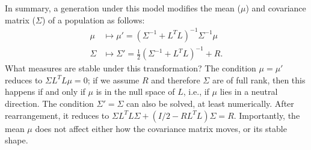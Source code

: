 \documentclass{article}
\newcommand{\1}{\mathbbm{1}}
\begin{document}
In summary, a generation under this model modifies the mean ($\mu$)
and covariance matrix ($\Sigma$) of a population as follows:
\begin{align*}
    \mu &\mapsto \mu' = (\Sigma^{-1}+L^T L)^{-1} \Sigma^{-1} \mu \\
    \Sigma &\mapsto \Sigma' = \frac{1}{2} (\Sigma^{-1} + L^T L)^{-1} + R .
\end{align*}
What measures are stable under this transformation?
The condition $\mu = \mu'$ reduces to $\Sigma L^T L \mu = 0$;
if we assume $R$ and therefore $\Sigma$ are of full rank,
then this happens if and only if $\mu$ is in the null space of $L$,
i.e., if $\mu$ lies in a neutral direction.
The condition $\Sigma' = \Sigma$ can also be solved,
at least numerically.
After rearrangement, it reduces to
$\Sigma L^T L \Sigma + (I/2 - R L^T L) \Sigma = R$.
Importantly, the mean $\mu$ does not affect 
either how the covariance matrix moves,
or its stable shape.
\end{document}
